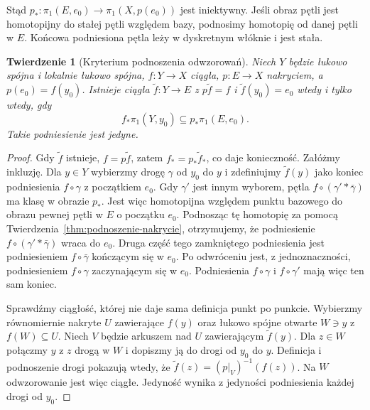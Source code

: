 \documentclass[11pt,a4paper,oneside]{report}
\theoremstyle{plain}
\newtheorem{twierdzenie}{Twierdzenie}[section]
\theoremstyle{definition}
\theoremstyle{remark}
\begin{document}
Stąd $p_*:\pi_1(E,e_0)\to\pi_1(X,p(e_0))$
jest iniektywny. Jeśli obraz pętli jest
homotopijny do stałej pętli względem bazy,
podnosimy homotopię od danej pętli w $E$.
Końcowa podniesiona pętla leży w dyskretnym
włóknie i jest stała.

\begin{twierdzenie}[Kryterium podnoszenia odwzorowań]
\label{thm:kryterium-podnoszenia}
Niech $Y$ będzie łukowo spójna i lokalnie
łukowo spójna, $f:Y\to X$ ciągła,
$p:E\to X$ nakryciem, a $p(e_0)=f(y_0)$.
Istnieje ciągła $\widetilde f:Y\to E$
z $p\widetilde f=f$ i
$\widetilde f(y_0)=e_0$ wtedy i tylko wtedy, gdy
\[
 f_*\pi_1(Y,y_0)\subseteq
 p_*\pi_1(E,e_0).
\]
Takie podniesienie jest jedyne.
\end{twierdzenie}
\begin{proof}
Gdy $\widetilde f$ istnieje,
$f=p\widetilde f$, zatem
$f_*=p_*\widetilde f_*$, co daje konieczność.
Załóżmy inkluzję. Dla $y\in Y$ wybierzmy
drogę $\gamma$ od $y_0$ do $y$ i
zdefiniujmy $\widetilde f(y)$ jako koniec
podniesienia $f\circ\gamma$ z początkiem $e_0$.
Gdy $\gamma'$ jest innym wyborem,
pętla $f\circ(\gamma'*\bar\gamma)$
ma klasę w obrazie $p_*$. Jest więc
homotopijna względem punktu bazowego
do obrazu pewnej pętli w $E$ o początku
$e_0$. Podnosząc tę homotopię za pomocą
Twierdzenia~\ref{thm:podnoszenie-nakrycie},
otrzymujemy, że podniesienie
$f\circ(\gamma'*\bar\gamma)$ wraca do $e_0$.
Druga część tego zamkniętego podniesienia jest podniesieniem
$f\circ\bar\gamma$ kończącym się w $e_0$.
Po odwróceniu jest, z jednoznaczności, podniesieniem
$f\circ\gamma$ zaczynającym się w $e_0$.
Podniesienia $f\circ\gamma$ i $f\circ\gamma'$ mają więc ten sam koniec.

Sprawdźmy ciągłość, której nie daje sama
definicja punkt po punkcie. Wybierzmy
równomiernie nakryte $U$ zawierające $f(y)$
oraz łukowo spójne otwarte $W\ni y$ z
$f(W)\subseteq U$. Niech $V$ będzie
arkuszem nad $U$ zawierającym $\widetilde f(y)$.
Dla $z\in W$ połączmy $y$ z $z$ drogą
w $W$ i dopiszmy ją do drogi od $y_0$
do $y$. Definicja i podnoszenie drogi
pokazują wtedy, że
$\widetilde f(z)=(p|_V)^{-1}(f(z))$.
Na $W$ odwzorowanie jest więc ciągłe.
Jedyność wynika z jedyności podniesienia
każdej drogi od $y_0$.
\end{proof}
\end{document}
